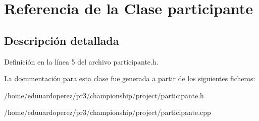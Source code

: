 \hypertarget{classparticipante}{}\section{Referencia de la Clase participante}
\label{classparticipante}


\subsection{Descripción detallada}


Definición en la línea 5 del archivo participante.\+h.



La documentación para esta clase fue generada a partir de los siguientes ficheros\+:\begin{DoxyCompactItemize}
\item 
/home/eduuardoperez/pr3/championship/project/participante.\+h\item 
/home/eduuardoperez/pr3/championship/project/participante.\+cpp\end{DoxyCompactItemize}
